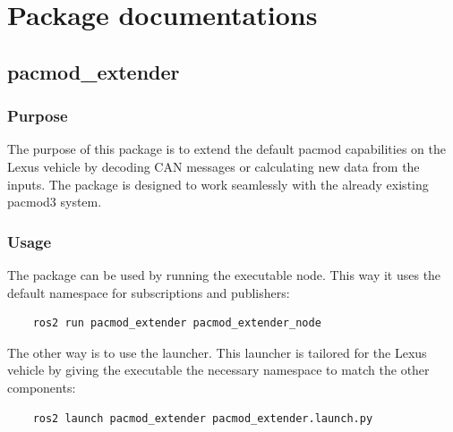 \documentclass[sn-mathphys-num]{sn-jnl}%
\begin{document}
\section{Package documentations}
\subsection{pacmod\_extender}
\subsubsection{Purpose}
The purpose of this package is to extend the default pacmod capabilities on the Lexus vehicle by decoding CAN messages or calculating new data from the inputs. The package is designed to work seamlessly with the already existing pacmod3 system.
\subsubsection{Usage}
The package can be used by running the executable node. This way it uses the default namespace for subscriptions and publishers:
\begin{lstlisting}
    ros2 run pacmod_extender pacmod_extender_node
\end{lstlisting}
The other way is to use the launcher. This launcher is tailored for the Lexus vehicle by giving the executable the necessary namespace to match the other components:
\begin{lstlisting}
    ros2 launch pacmod_extender pacmod_extender.launch.py
\end{lstlisting}
\end{document}
